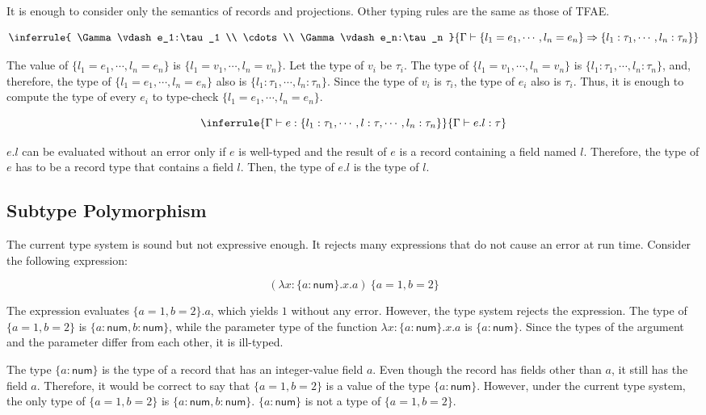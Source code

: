 It is enough to consider only the semantics of records and projections. Other
typing rules are the same as those of TFAE.

\[
\inferrule
{ \Gamma\vdash e_1:\tau_1 \\ \cdots \\ \Gamma\vdash e_n:\tau_n }
{ \Gamma\vdash
\{l_1=e_1,\cdots,l_n=e_n\}\Rightarrow\{l_1:\tau_1,\cdots,l_n:\tau_n\} }
\]

The value of $\{l_1=e_1,\cdots,l_n=e_n\}$ is $\{l_1=v_1,\cdots,l_n=v_n\}$.
Let the type of $v_i$ be $\tau_i$. The type of
$\{l_1=v_1,\cdots,l_n=v_n\}$ is $\{l_1:\tau_1,\cdots,l_n:\tau_n\}$, and,
therefore, the type of $\{l_1=e_1,\cdots,l_n=e_n\}$ also is
$\{l_1:\tau_1,\cdots,l_n:\tau_n\}$. Since the type of $v_i$ is $\tau_i$,
the type of $e_i$ also is $\tau_i$. Thus, it is enough to compute the type
of every $e_i$ to type-check $\{l_1=e_1,\cdots,l_n=e_n\}$.

\[
\inferrule
{ \Gamma\vdash e:\{l_1:\tau_1,\cdots,l:\tau,\cdots,l_n:\tau_n\} }
{ \Gamma\vdash e.l: \tau }
\]

$e.l$ can be evaluated without an error only if $e$ is well-typed and the
result of $e$ is a record containing a field named $l$. Therefore, the type
of $e$ has to be a record type that contains a field $l$. Then, the type of
$e.l$ is the type of $l$.

\subsection{Subtype Polymorphism}

The current type system is sound but not expressive enough. It rejects many
expressions that do not cause an error at run time. Consider the following
expression:

\[
(\lambda x:\{a:\textsf{num}\}.x.a)\ \{a=1,b=2\}
\]

The expression evaluates $\{a=1,b=2\}.a$, which yields $1$ without any
error. However, the type system rejects the expression. The type of
$\{a=1,b=2\}$ is $\{a:\textsf{num},b:\textsf{num}\}$, while the parameter type of
the function $\lambda x:\{a:\textsf{num}\}.x.a$ is $\{a:\textsf{num}\}$. Since the
types of the argument and the parameter differ from each other, it is ill-typed.

The type $\{a:\textsf{num}\}$ is the type of a record that has an integer-value
field $a$. Even though the record has fields other than $a$, it still has
the field $a$. Therefore, it would be correct to say that $\{a=1,b=2\}$ is a
value of the type $\{a:\textsf{num}\}$. However, under the current type system,
the only type of $\{a=1,b=2\}$ is $\{a:\textsf{num},b:\textsf{num}\}$. \(\{a:\textsf{
num}\}\) is not a type of $\{a=1,b=2\}$.

